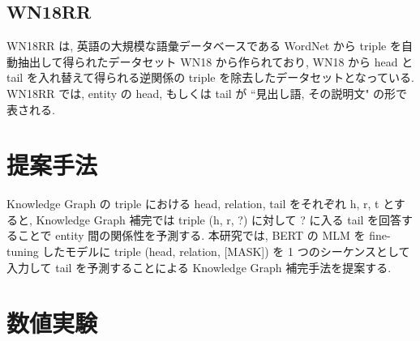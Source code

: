 \documentclass[a4paper,twoside,twocolumn,10pt]{article}
\begin{document}
\vspace{-1mm}
\subsection{WN18RR}

WN18RR \cite{wn18rr} は, 英語の大規模な語彙データベースである WordNet から triple を自動抽出して得られたデータセット WN18 から作られており, WN18 から head と tail を入れ替えて得られる逆関係の triple を除去したデータセットとなっている. WN18RR では, entity の head, もしくは tail が ``見出し語, その説明文" の形で表される. \par

\vspace{-1mm}
\section{提案手法}

Knowledge Graph の triple における head, relation, tail をそれぞれ h, r, t とすると, Knowledge Graph 補完では triple (h, r, ?) に対して ? に入る tail を回答することで entity 間の関係性を予測する. 本研究では, BERT の MLM を fine-tuning したモデルに triple (head, relation, [MASK]) を 1 つのシーケンスとして入力して tail を予測することによる Knowledge Graph 補完手法を提案する. 



\vspace{-1mm}
\section{数値実験}
\end{document}
